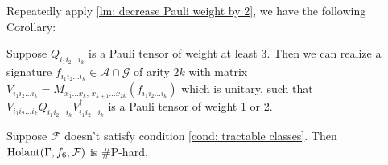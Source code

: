 Repeatedly apply \cref{lm: decrease Pauli weight by 2}, we have the following Corollary:

\begin{corollary}\label{cor: decrease Pauli weight}
    Suppose $Q_{i_1i_2\ldots i_k}$ is a Pauli tensor of weight at least $3.$
    Then we can realize a signature $f_{i_1i_2\ldots i_k}\in \mathscr{A}\cap\mathcal{G}$ of arity $2k$ with matrix $V_{i_1i_2\ldots i_k}=M_{x_1\ldots x_k,\, x_{k+1}\ldots x_{2k}}(f_{i_1i_2\ldots i_k})$ which is unitary, such that $V_{i_1i_2\ldots i_k}Q_{i_1i_2\ldots i_k}V_{i_1i_2\ldots i_k}^\dagger$ is a Pauli tensor of weight 1 or 2.
\end{corollary}

\begin{lemma}\label{lm: all 12 binary available is hard}
    Suppose $\mathcal{F}$ doesn't satisfy condition \eqref{cond: tractable classes}. 
    Then $\operatorname{Holant}(\Gamma, f_6, \mathcal{F})$ is \#P-hard.
\end{lemma}
